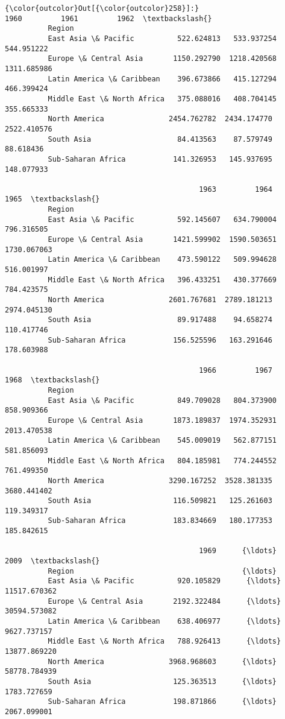 \documentclass[11pt]{article}
\begin{document}
\begin{Verbatim}[commandchars=\\\{\}]
{\color{outcolor}Out[{\color{outcolor}258}]:}                                    1960         1961         1962  \textbackslash{}
          Region                                                              
          East Asia \& Pacific          522.624813   533.937254   544.951222   
          Europe \& Central Asia       1150.292790  1218.420568  1311.685986   
          Latin America \& Caribbean    396.673866   415.127294   466.399424   
          Middle East \& North Africa   375.088016   408.704145   355.665333   
          North America               2454.762782  2434.174770  2522.410576   
          South Asia                    84.413563    87.579749    88.618436   
          Sub-Saharan Africa           141.326953   145.937695   148.077933   
          
                                             1963         1964         1965  \textbackslash{}
          Region                                                              
          East Asia \& Pacific          592.145607   634.790004   796.316505   
          Europe \& Central Asia       1421.599902  1590.503651  1730.067063   
          Latin America \& Caribbean    473.590122   509.994628   516.001997   
          Middle East \& North Africa   396.433251   430.377669   784.423575   
          North America               2601.767681  2789.181213  2974.045130   
          South Asia                    89.917488    94.658274   110.417746   
          Sub-Saharan Africa           156.525596   163.291646   178.603988   
          
                                             1966         1967         1968  \textbackslash{}
          Region                                                              
          East Asia \& Pacific          849.709028   804.373900   858.909366   
          Europe \& Central Asia       1873.189837  1974.352931  2013.470538   
          Latin America \& Caribbean    545.009019   562.877151   581.856093   
          Middle East \& North Africa   804.185981   774.244552   761.499350   
          North America               3290.167252  3528.381335  3680.441402   
          South Asia                   116.509821   125.261603   119.349317   
          Sub-Saharan Africa           183.834669   180.177353   185.842615   
          
                                             1969      {\ldots}               2009  \textbackslash{}
          Region                                       {\ldots}                      
          East Asia \& Pacific          920.105829      {\ldots}       11517.670362   
          Europe \& Central Asia       2192.322484      {\ldots}       30594.573082   
          Latin America \& Caribbean    638.406977      {\ldots}        9627.737157   
          Middle East \& North Africa   788.926413      {\ldots}       13877.869220   
          North America               3968.968603      {\ldots}       58778.784939   
          South Asia                   125.363513      {\ldots}        1783.727659   
          Sub-Saharan Africa           198.871866      {\ldots}        2067.099001   
          

\end{Verbatim}
\end{document}
